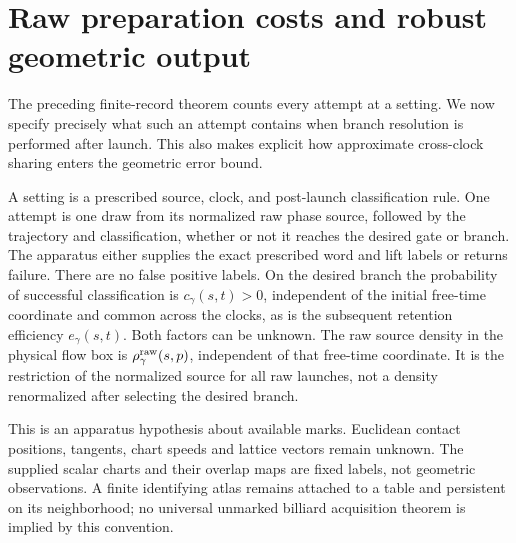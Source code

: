 \section{Raw preparation costs and robust geometric output}
\label{sec:v79-geometric-robustness}

The preceding finite-record theorem counts every attempt at a setting.
We now specify precisely what such an attempt contains when branch
resolution is performed after launch.  This also makes explicit how
approximate cross-clock sharing enters the geometric error bound.

\begin{definition}
\label{def:v79-raw}
A setting is a prescribed source, clock, and post-launch classification
rule.  One attempt is one draw from its normalized raw phase source,
followed by the trajectory and classification, whether or not it reaches
the desired gate or branch.  The apparatus either supplies the exact
prescribed word and lift labels or returns failure.  There are no false
positive labels.  On the desired branch the probability of successful
classification is $c_\gamma(s,t)>0$, independent of the initial free-time
coordinate and common across the clocks, as is the subsequent retention
efficiency $e_\gamma(s,t)$.  Both factors can be unknown.  The raw
source density in the physical flow box is $\rho_\gamma^{\rm raw}(s,p)$,
independent of that free-time coordinate.  It is the restriction of the
normalized source for all raw launches, not a density renormalized after
selecting the desired branch.
\end{definition}

This is an apparatus hypothesis about available marks.  Euclidean
contact positions, tangents, chart speeds and lattice vectors remain
unknown.  The supplied scalar charts and their overlap maps are fixed
labels, not geometric observations.  A finite identifying atlas remains
attached to a table and persistent on its neighborhood; no universal
unmarked billiard acquisition theorem is implied by this convention.

